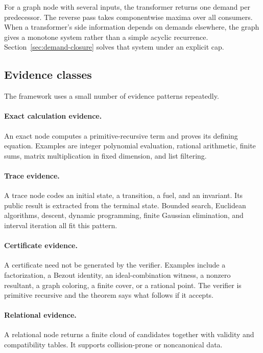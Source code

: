 For a graph node with several inputs, the transformer returns one demand per predecessor.  The reverse pass takes componentwise maxima over all consumers.  When a transformer's side information depends on demands elsewhere, the graph gives a monotone system rather than a simple acyclic recurrence.  Section~\ref{sec:demand-closure} solves that system under an explicit cap.

\subsection{Evidence classes}

The framework uses a small number of evidence patterns repeatedly.

\paragraph{Exact calculation evidence.}
An exact node computes a primitive-recursive term and proves its defining equation.  Examples are integer polynomial evaluation, rational arithmetic, finite sums, matrix multiplication in fixed dimension, and list filtering.

\paragraph{Trace evidence.}
A trace node codes an initial state, a transition, a fuel, and an invariant.  Its public result is extracted from the terminal state.  Bounded search, Euclidean algorithms, descent, dynamic programming, finite Gaussian elimination, and interval iteration all fit this pattern.

\paragraph{Certificate evidence.}
A certificate need not be generated by the verifier.  Examples include a factorization, a Bezout identity, an ideal-combination witness, a nonzero resultant, a graph coloring, a finite cover, or a rational point.  The verifier is primitive recursive and the theorem says what follows if it accepts.

\paragraph{Relational evidence.}
A relational node returns a finite cloud of candidates together with validity and compatibility tables.  It supports collision-prone or noncanonical data.

